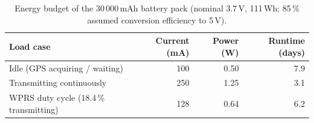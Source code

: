 \begin{table}[htbp]\centering\small
\caption{Energy budget of the 30\,000\,mAh battery pack (nominal 3.7\,V, 111\,Wh; 85\,\% assumed conversion efficiency to 5\,V).}\label{tab:wenergy}
\begin{tabular}{lrrr}
\toprule
Load case & Current (mA) & Power (W) & Runtime (days) \\
\midrule
Idle (GPS acquiring / waiting) & 100 & 0.50 & 7.9 \\
Transmitting continuously & 250 & 1.25 & 3.1 \\
WPRS duty cycle (18.4\,\% transmitting) & 128 & 0.64 & 6.2 \\
\bottomrule
\end{tabular}
\end{table}
